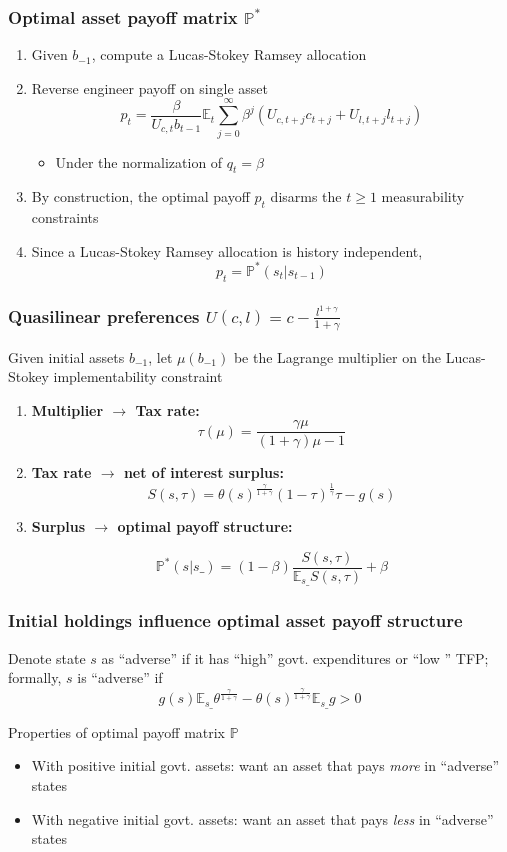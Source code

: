 \documentclass{beamer}
\newcommand{\EE}{\mathbb E}
\begin{document}
  \begin{frame}
\frametitle{Optimal asset payoff matrix $\mathbb{P}^*$}
\begin{enumerate}
 \item  Given $b_{-1}$, compute a Lucas-Stokey Ramsey allocation


 \item Reverse engineer  payoff on single asset
\[
	p_t = \frac{\beta}{U_{c,t}b_{t-1}}\EE_t\sum_{j=0}^\infty\beta^j\left(U_{c,t+j}c_{t+j}+U_{l,t+j}l_{t+j}\right)
\]
\begin{itemize}
	\item  Under the normalization of $q_t = \beta$
\end{itemize}
\item By construction, the optimal payoff  $p_t$   disarms the  $t\geq 1$
measurability constraints
\item Since a Lucas-Stokey Ramsey allocation is  history independent,
\[p_t=\mathbb{P}^*(s_t|s_{t-1})\]
\end{enumerate}
\end{frame}
%
\begin{frame}
\frametitle{Quasilinear preferences $U(c,l)=c-\frac{l^{1+\gamma}}{1+\gamma}$}
Given
 initial assets $b_{-1}$,  let $\mu(b_{-1})$ be the Lagrange multiplier on the Lucas-Stokey implementability constraint
\begin{enumerate}

 \item \textbf{Multiplier $\to$ Tax rate:}
 \[
		\tau(\mu) = \frac{\gamma\mu}{(1+\gamma)\mu-1}
	\]
 \item \textbf{Tax rate $\to$ net of interest surplus:}
 \[
		S(s,\tau) = \theta(s)^\frac\gamma{1+\gamma}(1-\tau)^\frac1\gamma\tau-g(s)
	\]
\item \textbf{Surplus $\to$ optimal payoff structure:}

\[
 \mathbb{P}^*(s|s\_) = (1-\beta)\frac{S(s,\tau)}{\EE_{s\_} S(s,\tau)} + \beta
 \]

 \end{enumerate}

\end{frame}

%
% 		
\begin{frame}		
   \frametitle{Initial holdings influence optimal asset payoff structure}
Denote state $s$ as ``adverse''  if it has ``high'' govt. expenditures or ``low '' TFP; formally, $s$ is ``adverse'' if
\[   g(s)\EE_{s\_}\theta^\frac{\gamma}{1+\gamma}-\theta(s)^\frac\gamma{1+\gamma}\EE_{s\_} g >0\]

Properties of  optimal payoff matrix $\mathbb{P}$

\begin{itemize}
 \item With positive initial govt. assets: want an asset  that pays {\em more} in ``adverse'' states
 \item With negative initial govt. assets: want an asset  that pays {\em less} in ``adverse'' states
\end{itemize}
\end{frame}
\end{document}
